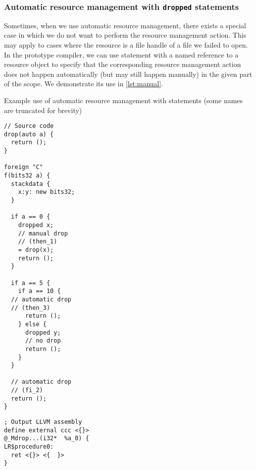 \subsubsection{Automatic resource management with \texttt{dropped} statements}

Sometimes, when we use automatic resource management, there exists a special case in which we do not want to perform the resource management action. This may apply to cases where the resource is a file handle of a file we failed to open. In the prototype compiler, we can use  statement with a named reference to a resource object to specify that the corresponding resource management action does not happen automatically (but may still happen manually) in the given part of the scope. We demonstrate its use in \cref{lst:manual}.


\begin{codex}
    \small
    \caption{Example use of automatic resource management with  statements (some names are truncated for brevity)}
    \label{lst:manual}
    \begin{center}
    \begin{minipage}{0.4\linewidth}
    \begin{lstlisting}[basicstyle=\scriptsize\ttfamily]
// Source code
drop(auto a) {
  return ();
}

foreign "C"
f(bits32 a) {
  stackdata {
    x:y: new bits32;
  }

  if a == 0 {
    dropped x;
    // manual drop
    // (then_1)
    = drop(x);
    return ();
  }

  if a == 5 {
    if a == 10 {
  // automatic drop
  // (then_3)
      return ();
    } else {
      dropped y;
      // no drop
      return ();
    }
  }

  // automatic drop
  // (fi_2)
  return ();
}
    \end{lstlisting}
    \end{minipage}%
    \begin{minipage}{0.6\linewidth}
    \begin{lstlisting}[style=llvmStyle,basicstyle=\scriptsize\ttfamily]
; Output LLVM assembly
define external ccc <{}>
@_Mdrop...(i32*  %a_0) {
LR$procedure0:
  ret <{}> <{  }>
}



\end{lstlisting}
\end{minipage}
\end{center}
\end{codex}
